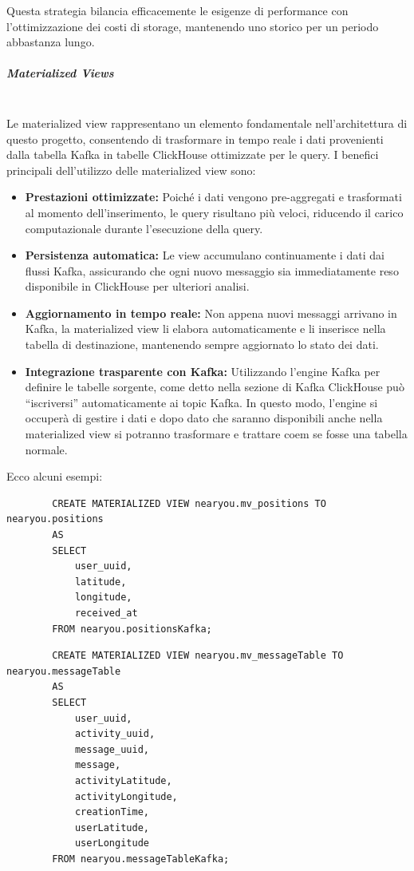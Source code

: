 \documentclass[10pt]{article}
\newcommand{\mysubparagraph}[1]{\subparagraph{#1}\mbox{}\\}
\begin{document}
        Questa strategia bilancia efficacemente le esigenze di performance con l'ottimizzazione dei costi di storage, mantenendo uno storico per un periodo abbastanza lungo.

        \mysubparagraph{Materialized Views}
        Le materialized view rappresentano un elemento fondamentale nell'architettura di questo progetto, consentendo di trasformare in tempo reale i dati provenienti dalla tabella Kafka in tabelle ClickHouse ottimizzate per le query. I benefici principali dell'utilizzo delle materialized view sono:
        \begin{itemize}
            \item \textbf{Prestazioni ottimizzate:} Poiché i dati vengono pre-aggregati e trasformati al momento dell'inserimento, le query risultano più veloci, riducendo il carico computazionale durante l'esecuzione della query.
            \item \textbf{Persistenza automatica:} Le view accumulano continuamente i dati dai flussi Kafka, assicurando che ogni nuovo messaggio sia immediatamente reso disponibile in ClickHouse per ulteriori analisi.
            \item \textbf{Aggiornamento in tempo reale:} Non appena nuovi messaggi arrivano in Kafka, la materialized view li elabora automaticamente e li inserisce nella tabella di destinazione, mantenendo sempre aggiornato lo stato dei dati.
            \item \textbf{Integrazione trasparente con Kafka:} Utilizzando l'engine Kafka per definire le tabelle sorgente, come detto nella sezione di Kafka ClickHouse può “iscriversi” automaticamente ai topic Kafka. In questo modo, l'engine si occuperà di gestire i dati e dopo dato che saranno disponibili anche nella materialized view si potranno trasformare e trattare coem se fosse una tabella normale.
        \end{itemize}
        
        Ecco alcuni esempi:

        \begin{lstlisting}
        CREATE MATERIALIZED VIEW nearyou.mv_positions TO nearyou.positions
        AS
        SELECT
            user_uuid,
            latitude,
            longitude,
            received_at
        FROM nearyou.positionsKafka;
        \end{lstlisting}

        \begin{lstlisting}
        CREATE MATERIALIZED VIEW nearyou.mv_messageTable TO nearyou.messageTable
        AS
        SELECT
            user_uuid,
            activity_uuid,
            message_uuid,
            message,
            activityLatitude,
            activityLongitude,
            creationTime,
            userLatitude,
            userLongitude
        FROM nearyou.messageTableKafka;
        \end{lstlisting}
\end{document}
